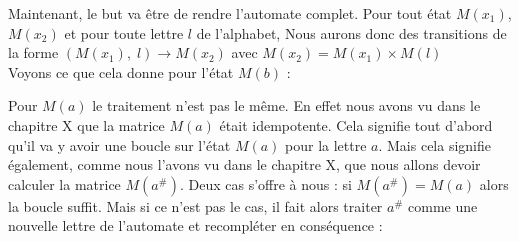 \documentclass{report}
\begin{document}
Maintenant, le but va être de rendre l'automate complet. Pour tout état $M(x_{1})$, $M(x_{2})$ et pour toute lettre $l$ de l'alphabet, Nous aurons donc des transitions de la forme $(M(x_{1}),\; l) \rightarrow M(x_{2})$  avec $M(x_{2}) = M(x_{1}) \times M(l)$\\
Voyons ce que cela donne pour l'état $M(b)$ :

\begin{center}
\end{center}
$\ $\\
 
Pour $M(a)$ le traitement n'est pas le même. En effet nous avons vu dans le chapitre X que la matrice $M(a)$ était idempotente. Cela signifie tout d'abord qu'il va y avoir une boucle sur l'état $M(a)$ pour la lettre $a$. Mais cela signifie également, comme nous l'avons vu dans le chapitre X, que nous allons devoir calculer la matrice $M(a^{\#})$. Deux cas s'offre à nous : si $M(a^{\#}) = M(a)$ alors la boucle suffit. Mais si ce n'est pas le cas, il fait alors traiter $a^{\#}$ comme une nouvelle lettre de l'automate et recompléter en conséquence : 

\begin{center}
\end{center}
$\ $\\
\end{document}
